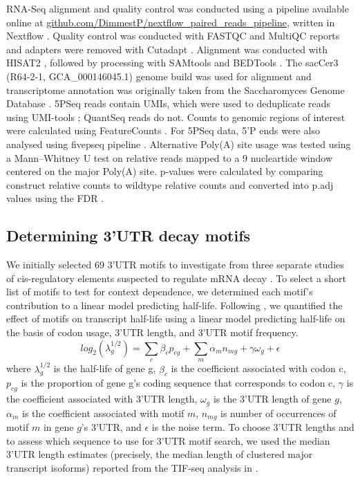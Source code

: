 \documentclass[../main.tex]{subfiles}
\begin{document}
RNA-Seq alignment and quality control was conducted using a pipeline available online at  \href{https://github.com/DimmestP/nextflow_paired_reads_pipeline}{github.com/DimmestP/nextflow\_paired\_reads\_pipeline}, written in Nextflow \parencite{DiTommaso2017}.
Quality control was conducted with FASTQC and MultiQC reports \parencite{Ewels2016} and adapters were removed with Cutadapt \parencite{Martin2011}.
Alignment was conducted with HISAT2 \parencite{Kim2019}, followed by processing with SAMtools \parencite{Li2009} and BEDTools \parencite{Quinlan2010}.
The sacCer3 (R64-2-1, GCA\_000146045.1) genome build was used for alignment and transcriptome annotation was originally taken from the Saccharomyces Genome Database \parencite{Ng2020}.
5PSeq reads contain UMIs, which were used to deduplicate reads using UMI-tools \parencite{Smith2017}; QuantSeq reads do not.
Counts to genomic regions of interest were calculated using FeatureCounts \parencite{Liao2014}.
For 5PSeq data, 5'P ends were also analysed using fivepseq pipeline \cite{Nersisyan2020}.
Alternative Poly(A) site usage was tested using a Mann–Whitney U test \parencite{Mann1947} on relative reads mapped to a 9 nucleartide window centered on the major Poly(A) site.
p-values were calculated by comparing construct relative counts to wildtype relative counts and converted into p.adj values using the FDR \parencite{Benjamini1995}.


\subsection{Determining 3'UTR decay motifs}

We initially selected 69 3'UTR motifs to investigate from three separate studies of cis-regulatory elements suspected to regulate mRNA decay \parencite{Hogan2008, Shalgi2005, Cheng2017}.
To select a short list of motifs to test for context dependence, we determined each motif's contribution to a linear model predicting half-life.
Following \parencite{Cheng2017}, we quantified the effect of motifs on transcript half-life using a linear model predicting half-life on the basis of codon usage, 3'UTR length, and 3'UTR motif frequency.
\[log_2(\lambda_g^{1/2}) = \sum_c\beta_cp_{cg} + \sum_m\alpha_mn_{mg} + \gamma \omega_g + \epsilon\]
where \(\lambda_g^{1/2}\) is the half-life of gene g, \(\beta_c\) is the coefficient associated with codon c, \(p_{cg}\) is the proportion of gene g's coding sequence that corresponds to codon c, \(\gamma\) is the coefficient associated with 3'UTR length, \(\omega_g\) is the 3'UTR length of gene \(g\), \(\alpha_m\) is the coefficient associated with motif \(m\), \(n_{mg}\) is number of occurrences of motif \(m\) in gene \(g\)'s 3'UTR, and \(\epsilon\) is the noise term.
To choose 3'UTR lengths and to assess which sequence to use for 3'UTR motif search, we used the median 3'UTR length estimates (precisely, the median length of clustered major transcript isoforms) reported from the TIF-seq analysis in \parencite{Pelechano2013}.
\end{document}
